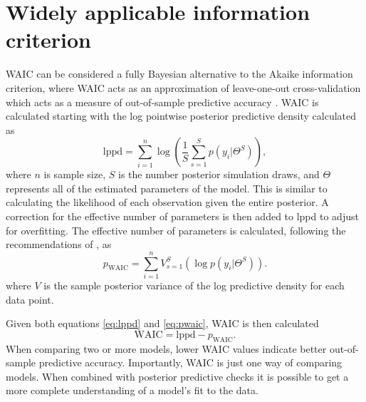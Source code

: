 \documentclass[12pt,letterpaper]{article}
\begin{document}
\section{Widely applicable information criterion} \label{sec:waic}
WAIC can be considered a fully Bayesian alternative to the Akaike information criterion, where WAIC acts as an approximation of leave-one-out cross-validation which acts as a measure of out-of-sample predictive accuracy \citep{Gelman2013d}. WAIC is calculated starting with the log pointwise posterior predictive density calculated as
\begin{equation}
  \mathrm{lppd} = \sum_{i = 1}^{n} \log \left(\frac{1}{S} \sum_{s = 1}^{S} p(y_{i}|\Theta^{S})\right),
  \label{eq:lppd}
\end{equation}
where \(n\) is sample size, \(S\) is the number posterior simulation draws, and \(\Theta\) represents all of the estimated parameters of the model. This is similar to calculating the likelihood of each observation given the entire posterior. A correction for the effective number of parameters is then added to lppd to adjust for overfitting. The effective number of parameters is calculated, following the recommendations of \citet{Gelman2013d}, as
\begin{equation}
  p_{\mathrm{WAIC}} = \sum_{i = 1}^{n} V_{s = 1}^{S} (\log p(y_{i}|\Theta^{S})).
  \label{eq:pwaic}
\end{equation}
where \(V\) is the sample posterior variance of the log predictive density for each data point.

Given both equations \ref{eq:lppd} and \ref{eq:pwaic}, WAIC is then calculated
\begin{equation}
  \mathrm{WAIC} = \mathrm{lppd} - p_{\mathrm{WAIC}}.
  \label{eq:waic}
\end{equation}
When comparing two or more models, lower WAIC values indicate better out-of-sample predictive accuracy. Importantly, WAIC is just one way of comparing models. When combined with posterior predictive checks it is possible to get a more complete understanding of a model's fit to the data.

\clearpage



\end{document}

